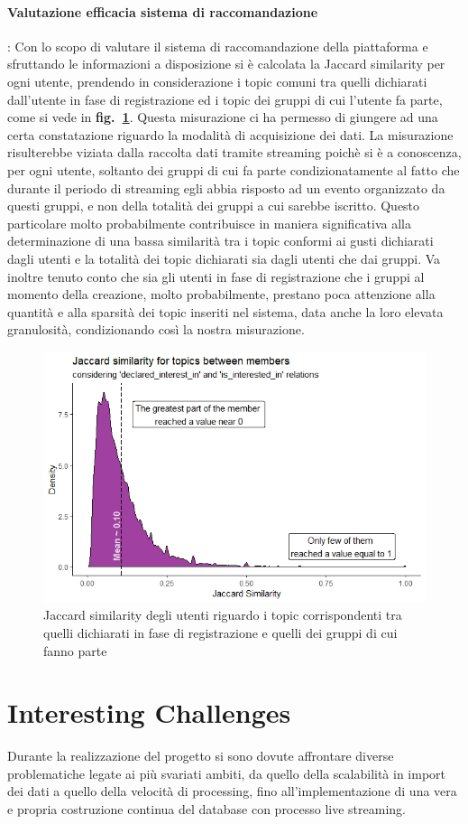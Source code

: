 \documentclass[fleqn,10pt]{SelfArx} %
\begin{document}
{\paragraph{Valutazione efficacia sistema di raccomandazione}:
Con lo scopo di valutare il sistema di raccomandazione della piattaforma e sfruttando le informazioni a disposizione si è calcolata la Jaccard similarity per ogni utente, prendendo in considerazione i topic comuni tra quelli dichiarati dall'utente in fase di registrazione ed i topic dei gruppi di cui l'utente fa parte, come si vede in \textbf{fig.~\ref{jaccard_similarity}}. 
Questa misurazione ci ha permesso di giungere ad una certa constatazione riguardo la modalità di acquisizione dei dati. 
La misurazione risulterebbe viziata dalla raccolta dati tramite streaming poichè si è a conoscenza, per ogni utente, soltanto dei gruppi di cui fa parte condizionatamente al fatto che durante il periodo di streaming egli abbia risposto ad un evento organizzato da questi gruppi, e non della totalità dei gruppi a cui sarebbe iscritto. 
Questo particolare molto probabilmente contribuisce in maniera significativa alla determinazione di una bassa similarità tra i topic conformi ai gusti dichiarati dagli utenti e la totalità dei topic dichiarati sia dagli utenti che dai gruppi. 
Va inoltre tenuto conto che sia gli utenti in fase di registrazione che i gruppi al momento della creazione, molto probabilmente, prestano poca attenzione alla quantità e alla sparsità dei topic inseriti nel sistema, data anche la loro elevata granulosità, condizionando così la nostra misurazione. 
\begin{figure}
\centering
\includegraphics[width = 8.7 cm, height = 5 cm]{jaccard_similarity.jpeg}
\caption{\label{jaccard_similarity} Jaccard similarity degli utenti riguardo i topic corrispondenti tra quelli dichiarati in fase di registrazione e quelli dei gruppi di cui fanno parte}
\end{figure}
\section{Interesting Challenges}
{\small
Durante la realizzazione del progetto si sono dovute affrontare diverse problematiche legate ai più svariati ambiti, da quello della scalabilità in import dei dati a quello della velocità di processing, fino all'implementazione di una vera e propria costruzione continua del database con processo live streaming.
}}
\end{document}
